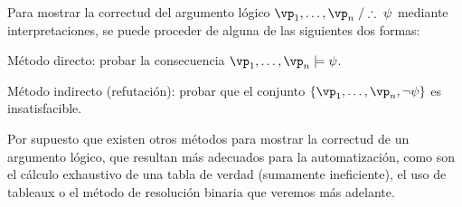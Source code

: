 \documentclass[11pt,letterpaper]{article}
\begin{document}
Para mostrar la correctud del argumento l\'ogico 
$\vp_1,\ldots,\vp_n\;/\therefore\; \psi$
mediante interpretaciones, se puede proceder de alguna de las siguientes dos 
formas:

\bi
\item M\'etodo directo: probar la consecuencia $\vp_1,\ldots,\vp_n\models \psi$.

\item M\'etodo indirecto (refutaci\'on): probar que el conjunto
$\{\vp_1,\ldots, \vp_n,\lnot \psi\}$ es insatisfacible.
\ei

Por supuesto que existen otros m\'etodos para mostrar la correctud de un
argumento l\'ogico, que resultan m\'as adecuados para la
automatizaci\'on, como son el c\'alculo exhaustivo de una tabla de verdad 
(sumamente ineficiente),
el uso de tableaux o el m\'etodo de resoluci\'on binaria que veremos m\'as 
adelante.
\end{document}
